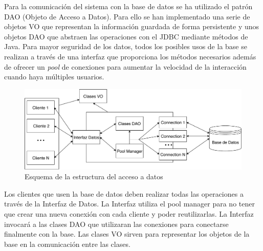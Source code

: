Para la comunicación del sistema con la base de datos se ha utilizado el patrón DAO (Objeto de Acceso a Datos). Para ello se han implementado una serie de objetos VO que representan la información guardada de forma persistente y unos objetos DAO que abstraen las operaciones con el JDBC mediante métodos de Java. Para mayor seguridad de los datos, todos los posibles usos de la base se realizan a través de una interfaz que proporciona los métodos necesarios además de ofrecer un \textit{pool} de conexiones para aumentar la velocidad de la interacción cuando haya múltiples usuarios.\\

\begin{figure}[H]
\centering
\includegraphics[scale = 0.5]{figuras/base_datos/Componentes.pdf}
\caption{Esquema de la estructura del acceso a datos}
\label{fig:componentesbases}
\end{figure}

Los clientes que usen la base de datos deben realizar todas las operaciones a través de la Interfaz de Datos. La Interfaz utiliza el pool manager para no tener que crear una nueva conexión con cada cliente y poder reutilizarlas. La Interfaz invocará a las clases DAO que utilizaran las conexiones para conectarse finalmente con la base. Las clases VO sirven para representar los objetos de la base en la comunicación entre las clases.\\


